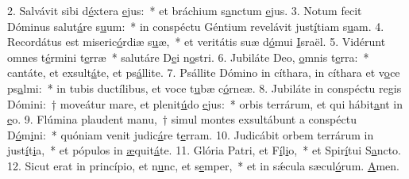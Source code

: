 2. Salvávit sibi d\uline{é}xtera \uline{e}jus:~* et bráchium s\uline{a}nctum \uline{e}jus.
3. Notum fecit Dóminus salut\uline{á}re s\uline{u}um:~* in conspéctu Géntium revelávit just\uline{í}tiam s\uline{u}am.
4. Recordátus est miseric\uline{ó}rdiæ s\uline{u}æ,~* et veritátis suæ d\uline{ó}mui \uline{I}sraël.
5. Vidérunt omnes t\uline{é}rmini t\uline{e}rræ~* salutáre D\uline{e}i n\uline{o}stri.
6. Jubiláte Deo, \uline{o}mnis t\uline{e}rra:~* cantáte, et exsult\uline{á}te, et ps\uline{á}llite.
7. Psállite Dómino in cíthara, in cíthara et v\uline{o}ce ps\uline{a}lmi:~* in tubis ductílibus, et voce t\uline{u}bæ c\uline{ó}rneæ.
8. Jubiláte in conspéctu regis Dómini:~† moveátur mare, et plenit\uline{ú}do \uline{e}jus:~* orbis terrárum, et qui hábit\uline{a}nt in \uline{e}o.
9. Flúmina plaudent manu,~† simul montes exsultábunt a conspéctu D\uline{ó}m\uline{i}ni:~* quóniam venit judic\uline{á}re t\uline{e}rram.
10. Judicábit orbem terrárum in just\uline{í}t\uline{i}a,~* et pópulos in \uline{æ}quit\uline{á}te.
11. Glória Patri, et F\uline{í}l\uline{i}o,~* et Spir\uline{í}tui S\uline{a}ncto.
12. Sicut erat in princípio, et n\uline{u}nc, et s\uline{e}mper,~* et in sǽcula sæcul\uline{ó}rum. \uline{A}men.
